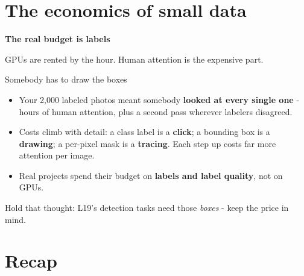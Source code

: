 \documentclass[aspectratio=169]{beamer}
\begin{document}
\section{The economics of small data}

\begin{frame}[plain]
  \vfill
  \begin{center}
    {\Large\color{popblue}\textbf{The real budget is labels}}\\[0.9em]
    \begin{minipage}{0.82\textwidth}\centering\small
      GPUs are rented by the hour. Human attention is the expensive part.
    \end{minipage}
  \end{center}
  \vfill
\end{frame}

\begin{frame}{Somebody has to draw the boxes}
  \begin{itemize}
    \item Your 2,000 labeled photos meant somebody \textbf{looked at every single one} -
      hours of human attention, plus a second pass wherever labelers disagreed.
    \item Costs climb with detail: a class label is a \textbf{click}; a bounding box is a
      \textbf{drawing}; a per-pixel mask is a \textbf{tracing}. Each step up costs far
      more attention per image.
    \item Real projects spend their budget on \textbf{labels and label quality}, not on
      GPUs.
  \end{itemize}
  \vskip 8pt
  \vskip 6pt
  {\small Hold that thought: L19's detection tasks need those \emph{boxes} - keep the
  price in mind.}
\end{frame}

\section*{Recap}
\end{document}
